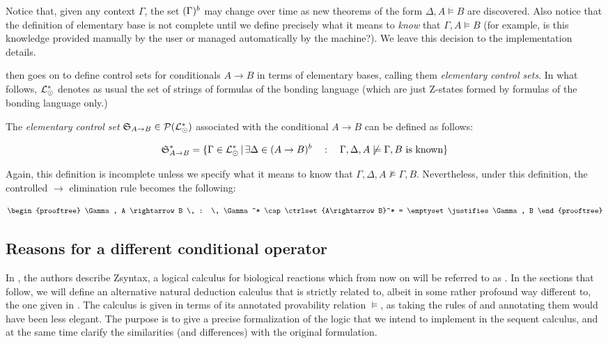 Notice that, given any context $\Gamma$, the set $(\Gamma)^{b}$ may change
over time as new theorems of the form $\Delta, A \models B$ are discovered.
Also notice that the definition of elementary base is not complete until we
define precisely what it means to \emph{know} that $\Gamma, A \models B$ (for
example, is this knowledge provided manually by the user or managed
automatically by the machine?). We leave this decision to the implementation
details.

\cite{adding-logic} then goes on to define control sets for conditionals
$A \rightarrow B$ in terms of elementary bases, calling them \emph{elementary
  control sets}.  In what follows, $\mathcal{L}_{\odot}^*$ denotes as usual the set of
strings of formulas of the bonding language (which are just Z-states formed by
formulas of the bonding language only.)

\begin{definition}
  The \emph{elementary control set}
  $\mathfrak{S}_{A \rightarrow B} \in \mathcal{P}(\mathcal{L}_{\odot}^*)$ associated with
  the conditional $A \rightarrow B$ can be defined as follows:

  \[
    \mathfrak{S}_{A \rightarrow B}^* = \{
    \Gamma \in \mathcal{L}_{\odot}^* \, | \, \exists \Delta \in (A \rightarrow
    B)^{b}
    \quad : \quad \Gamma, \Delta, A \not \models \Gamma, B \text{ is known}
    \}
  \]
\end{definition}

Again, this definition is incomplete unless we specify what it means to know
that $\Gamma, \Delta, A \not \models \Gamma, B$. Nevertheless, under this
definition, the controlled $\rightarrow$ elimination rule becomes the following:

\[
  \begin{prooftree}
    \Gamma, A \rightarrow B \, : \, \Gamma^* \cap \ctrlset{A\rightarrow B}^* =
    \emptyset
    \justifies
    \Gamma, B
  \end{prooftree}
\]

\subsection{Reasons for a different conditional operator}

In \cite{adding-logic}, the authors describe Zsyntax, a logical calculus for
biological reactions which from now on will be referred to as \znd{}. In the
sections that follow, we will define an alternative natural deduction calculus
that is strictly related to, albeit in some rather profound way different to,
the one given in \cite{adding-logic}.  The calculus is given in terms of its
annotated provability relation $\models$, as taking the rules of
\cite{adding-logic} and annotating them would have been less elegant.  The
purpose is to give a precise formalization of the logic that we intend to
implement in the sequent calculus, and at the same time clarify the similarities
(and differences) with the original formulation.

